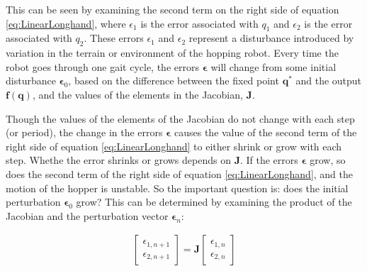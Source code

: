 This can be seen by examining the second term on the right side of equation
\ref{eq:LinearLonghand}, where $\epsilon_{1}$ is the error associated with
$q_{1}$ and $\epsilon_{2}$ is the error associated with $q_{2}$. These errors
$\epsilon_{1}$ and $\epsilon_{2}$ represent a disturbance introduced by
variation in the terrain or environment of the hopping robot. Every time the
robot goes through one gait cycle, the errors $\mathbf{\epsilon}$ will change
from some initial disturbance $\mathbf{\epsilon}_{0}$, based on the difference
between  the fixed point
$\mathbf{\mathbf{q}}^{*}$ and the output $\mathbf{f}(\mathbf{q})$, and the
values of the elements in the Jacobian, $\mathbf{J}$.

Though the values of the elements of the Jacobian do not change with each step
(or period), the change in the errors $\mathbf{\epsilon}$ causes the value of
the second term of the right side of equation \ref{eq:LinearLonghand} to either
shrink or grow with each step. Whethe the error shrinks or grows depends on
$\mathbf{J}$. If the errors $\mathbf{\epsilon}$ grow, so does the second term
of the right side of equation \ref{eq:LinearLonghand}, and the motion of the
hopper is unstable. So the important question is: does the initial perturbation
$\mathbf{\epsilon}_{0}$ grow? This can be determined by examining the
product of the Jacobian and the perturbation vector $\mathbf{\epsilon}_{n}$:

\begin{align}
\begin{bmatrix}
\epsilon_{1,n+1} \\
\epsilon_{2,n+1}
\end{bmatrix}
=
\mathbf{J}
\begin{bmatrix}
\epsilon_{1,n} \\
\epsilon_{2,n}
\end{bmatrix}
\label{eq:ErrorAndJacobian}
\end{align}


